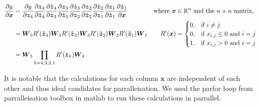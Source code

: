 \documentclass[11pt]{article}
\begin{document}
\begin{align}
	\frac{\partial y}{\partial \boldsymbol{x}} &= \frac{\partial y}{\partial \boldsymbol{z}_4}\frac{\partial \boldsymbol{z}_4}{\partial \hat{\boldsymbol{z}}_4}\frac{\partial \hat{\boldsymbol{z}}_4}{\partial \boldsymbol{z}_3}\frac{\partial \boldsymbol{z}_3}{\partial \hat{\boldsymbol{z}}_3}\frac{\partial \hat{\boldsymbol{z}}_3}{\partial \boldsymbol{z}_2}\frac{\partial \boldsymbol{z}_2}{\partial \hat{\boldsymbol{z}}_2}\frac{\partial \hat{\boldsymbol{z}}_2}{\partial \boldsymbol{z}_1}\frac{\partial \boldsymbol{z}_1}{\partial \hat{\boldsymbol{z}}_1}\frac{\partial \hat{\boldsymbol{z}}_1}{\partial \boldsymbol{x}} 
    &     
    \text{where } \boldsymbol{x}& \in \mathbb{R}^n \text{ and the } n\times n \text{ matrix}, \notag 
    \\
	&=\boldsymbol{W}_5 R^\prime (\hat{\boldsymbol{z}}_4) \boldsymbol{W}_4 R^\prime (\hat{\boldsymbol{z}}_3) \boldsymbol{W}_3 R^\prime (\hat{\boldsymbol{z}}_2) \boldsymbol{W}_2 R^\prime (\hat{\boldsymbol{z}}_1) \boldsymbol{W}_1  
    & 
    R^\prime(\boldsymbol{x})& = 
    \begin{cases}
        0,& \text{if } i \neq j\\
        0,              & \text{if } x_{i,j} \leq 0  \text{ and } i=j\\
        1, & \text{if } x_{i,j} > 0  \text{ and } i=j
    \end{cases} \notag
    \\
    &= \boldsymbol{W}_5 \prod_{k=4,3,2,1} R^\prime (\hat{\boldsymbol{z}}_k) \boldsymbol{W}_k  \label{eq:Task4}
\end{align}
 
    
It is notable that the calculations for each column $\boldsymbol{x}$ are independent of each other and thus ideal candidates for parralleisation. We used the parfor loop from parralleisation toolbox in matlab to run these calculations in parrallel.
\end{document}
